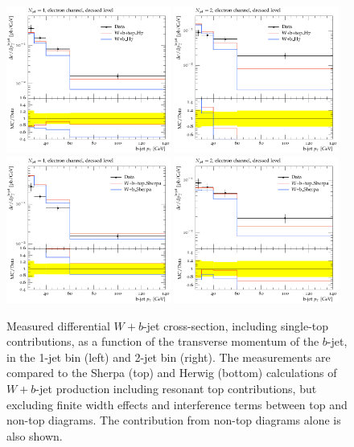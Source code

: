 \documentclass[11pt]{cernrep}
\begin{document}
\begin{figure}
\centering
	\includegraphics[width=0.48\textwidth]{unsubtracted-h7-1jet.pdf}
	\includegraphics[width=0.48\textwidth]{unsubtracted-h7-2jet.pdf}
	\includegraphics[width=0.48\textwidth]{unsubtracted-s22-1jet.pdf}
	\includegraphics[width=0.48\textwidth]{unsubtracted-s22-2jet.pdf}
\caption{\label{fig:unsubtracted}
  Measured differential $W+b$-jet cross-section, including single-top contributions, as a function of the
  transverse momentum of the $b$-jet, in the 1-jet bin (left) and 2-jet bin (right).
  The measurements are compared to the Sherpa (top) and Herwig (bottom)
  calculations of $W+b$-jet production including resonant top contributions, but excluding finite width effects
  and interference terms between top and non-top diagrams. The contribution from non-top diagrams alone is
  also shown.}
\end{figure}
\end{document}

